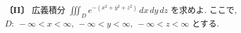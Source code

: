 \noindent\textbf{〔II〕}
広義積分 $\displaystyle\iiint_D e^{-(x^2+y^2+z^2)}\,dx\,dy\,dz$ を求めよ.
ここで, $D:\ -\infty<x<\infty,\ -\infty<y<\infty,\ -\infty<z<\infty$ とする.
